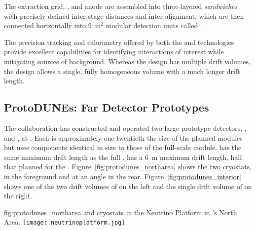 The extraction grid, , and anode are assembled into three-layered \textit{sandwiches} with precisely defined inter-stage distances and inter-alignment,  which are then connected horizontally into \num{9}~m$^2$ modular detection units called .

The precision tracking and calorimetry offered by both the  and  technologies provide excellent capabilities for identifying interactions of interest while mitigating sources of background.  Whereas the  design has multiple drift volumes, the  design allows a single, fully homogeneous  volume with a much longer drift length.

\FloatBarrier

\subsection{ProtoDUNEs: Far Detector Prototypes}
\label{sec:exec:overall:pdune}

The  collaboration has constructed and operated 
two large prototype detectors, , and , at .  %
 Each is approximately one-twentieth the size of the planned  modules but uses components identical in size to those of the full-scale module.  has the same \spmaxdrift maximum drift length as the full .  has a \SI{6}{m} maximum drift length, half that planned for the .  Figure~\ref{fig:protodunes_northarea} shows the two cryostats,  in the foreground and  at an angle in the rear. Figure~\ref{fig:protodunes_interior} shows one of the two drift volumes of  on the left and the single drift volume of  on the right.

\begin{dunefigure}
{fig:protodunes_northarea}
{ and  cryostats in the  Neutrino Platform in 's North Area.}
\texttt{[image: neutrinoplatform.jpg]}
\end{dunefigure}

